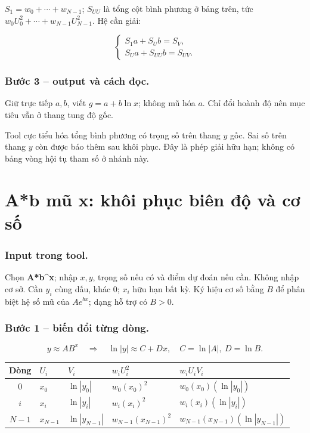$S_1=w_0+\cdots+w_{N-1}$; $S_{UU}$ là tổng cột bình phương ở bảng trên, tức $w_0U_0^2+\cdots+w_{N-1}U_{N-1}^2$. Hệ cần giải:

\[\boxed{\begin{cases}S_1a+S_Ub=S_V,\\S_Ua+S_{UU}b=S_{UV}.\end{cases}}\]

\subsubsection*{Bước 3 -- output và cách đọc.} Giữ trực tiếp $a,b$, viết $g=a+b\ln x$; không mũ hóa $a$. Chỉ đổi hoành độ nên mục tiêu vẫn ở thang tung độ gốc.

Tool cực tiểu hóa tổng bình phương có trọng số trên thang $y$ gốc. Sai số trên thang $y$ còn được báo thêm sau khôi phục. Đây là phép giải hữu hạn; không có bảng vòng hội tụ tham số ở nhánh này.

\examplebreak
\section{A*b mũ x: khôi phục biên độ và cơ số}

\label{sec:ls-geometric}

\subsubsection*{Input trong tool.} Chọn \textbf{A*b\textasciicircum{}x}; nhập $x,y$, trọng số nếu có và điểm dự đoán nếu cần. Không nhập cơ sở. Cần $y_i$ cùng dấu, khác 0; $x_i$ hữu hạn bất kỳ. Ký hiệu cơ số bằng $B$ để phân biệt hệ số mũ của $Ae^{bx}$; dạng hỗ trợ có $B>0$.

\subsubsection*{Bước 1 -- biến đổi từng dòng.}\[y\approx AB^x\quad\Longrightarrow\quad\ln|y|\approx C+Dx,\quad C=\ln|A|,\ D=\ln B.\]

\begin{center}\small\begin{tabular}{cllll}\toprule

Dòng&$U_i$&$V_i$&$w_iU_i^2$&$w_iU_iV_i$\\\midrule

$0$&$x_0$&$\ln|y_0|$&$w_{0}(x_0)^2$&$w_{0}(x_0)(\ln|y_0|)$\\

$i$&$x_{i}$&$\ln|y_{i}|$&$w_{i}(x_{i})^2$&$w_{i}(x_{i})(\ln|y_{i}|)$\\

$N-1$&$x_{N-1}$&$\ln|y_{N-1}|$&$w_{N-1}(x_{N-1})^2$&$w_{N-1}(x_{N-1})(\ln|y_{N-1}|)$\\

\bottomrule\end{tabular}\end{center}

